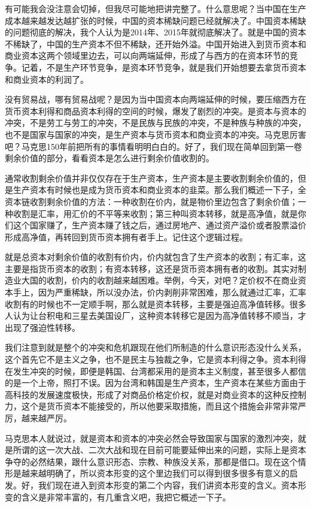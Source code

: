 \documentclass[UTF8, 12pt, a4paper]{ctexrep}
\begin{document}
有可能我会没注意会切掉，但我尽可能地把讲完整了。什么意思呢？当中国在生产成本越来越发达越扩张的时候，中国的资本稀缺问题已经就解决了。中国资本稀缺的问题彻底的解决，我个人认为是2014年、2015年就彻底解决了。就是中国的资本不稀缺了，中国的生产资本不但不稀缺，还开始外溢。中国开始进入到货币资本和商业资本这两个领域里边去，可以向两端延伸，形成了与西方的在资本环节的竞争。记着，不是生产环节竞争，是资本环节竞争，就是我们开始想要去拿货币资本和商业资本的利润了。

没有贸易战，哪有贸易战呢？是因为当中国资本向两端延伸的时候，要压缩西方在货币资本利得和商品资本利得的空间的时候，爆发了剧烈的冲突。是资本与资本的冲突，不是劳工与劳工的冲突，不是民族与民族的冲突，不是种族与种族的冲突，也不是国家与国家的冲突，是生产资本与货币资本和商业资本的冲突。马克思厉害吧？马克思150年前把所有的事情看明明白白的。好了，我们现在简单回到第一卷剩余价值的部分，看看资本是怎么进行剩余价值收割的。

通常收割剩余价值并非仅仅存在于生产资本，生产资本是主要收割剩余价值的，但是生产资本有时候也是成为货币资本和商业资本的韭菜。那么我们概述一下子，全资本链收割剩余价值的方法：一种收割在价内，就是物价里边包含了剩余价值；一种收割是汇率，用汇价的不平等来收割；第三种叫资本转移，就是高净值，就是你们这个国家赚了，生产资本赚了钱之后，通过房地产、通过资产溢价或者股票溢价形成高净值，再转回到货币资本拥有者手上。记住这个逻辑过程。

就是总资本对剩余价值的收割有价内，价内就包含了生产资本的收割；有汇率，这主要是指货币资本的收割；有资本转移，这还是货币资本拥有者的收割。其实对制造业大国的收割，价内的收割越来越困难。举例，今天，对吧？定价权不在商业资本手上，因为严重稀缺，所以没办法，价内剥削非常困难，那么就通过汇率，汇率收割有的时候也不一定顺手啊，那么就是资本转移，主要是强迫高净值转移。很多人认为让台积电和三星去美国设厂，这种资本转移它是因为高净值转移不顺当，才出现了强迫性转移。

我们注意到就是整个的冲突和危机跟现在他们所制造的什么意识形态没什么关系，这个首先它不是主义之争，也不是民主与独裁之争，它是资本利得之争。资本利得在发生冲突的时候，即便是韩国、台湾都采用的是资本主义制度，甚至很多人都信的是一个上帝，照打不误。因为台湾和韩国是生产资本，生产资本在某些方面由于高科技的发展速度极快，形成了对商品价格定价权，就是对商业资本的这种反控制力，这个是货币资本不能接受的，所以他要采取措施，而且这个措施会非常非常严厉，越来越严厉。

马克思本人就说过，就是资本和资本的冲突必然会导致国家与国家的激烈冲突，就是所谓的这一次大战、二次大战和现在目前可能要延伸出来的问题，实际上是资本争夺的必然结果，跟什么意识形态、宗教、种族没关系，那都是借口。现在这个情形是越来越明确了，所以资本形变的这个里边我们可以得到很多很多有意义的启发。好，我们现在进入到资本形变的第二个内容，我们讲资本形变的含义。资本形变的含义是非常丰富的，有几重含义吧，我把它概述一下子。
\end{document}
